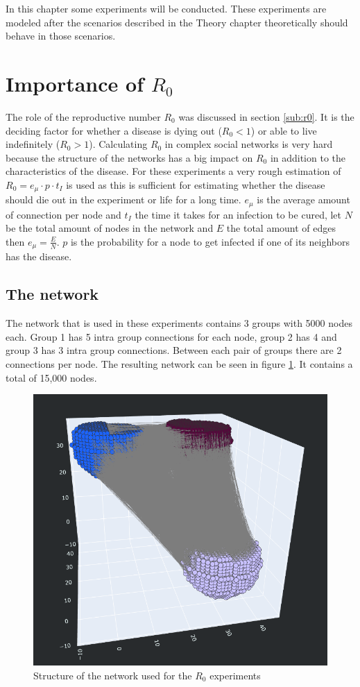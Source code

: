 In this chapter some experiments will be conducted. These experiments are modeled after the scenarios described in the Theory chapter %
theoretically should behave in those scenarios.

\section{Importance of $R_0$}
The role of the reproductive number $R_0$ was discussed in section \ref{sub:r0}. It is the deciding factor for whether a disease is dying out ($R_0 < 1$) or able to live indefinitely ($R_0 > 1$). Calculating $R_0$ in complex social networks is very hard because the structure of the networks has a big impact on $R_0$ in addition to the characteristics of the disease. For these experiments a very rough estimation of $R_0=e_\mu \cdot p \cdot t_I$ is used as this is sufficient for estimating whether the disease should die out in the experiment or life for a long time. $e_\mu$ is the average amount of connection per node and $t_I$ the time it takes for an infection to be cured, let $N$ be the total amount of nodes in the network and $E$ the total amount of edges then $e_\mu=\frac{E}{N}$. $p$ is the probability for a node to get infected if one of its neighbors has the disease.

\subsection{The network}
\label{sub:exp_network}
The network that is used in these experiments contains 3 groups with 5000 nodes each. Group 1 has 5 intra group connections for each node, group 2 has 4 and group 3 has 3 intra group connections. Between each pair of groups there are 2 connections per node. The resulting network can be seen in figure \ref{fig:exp_r0_network}. It contains a total of 15,000 nodes.

\begin{figure}
    \centering
    \includegraphics[width=0.5\linewidth]{images/experiment_r0_network.png}
    \caption{Structure of the network used for the $R_0$ experiments}
    \label{fig:exp_r0_network}
\end{figure}

